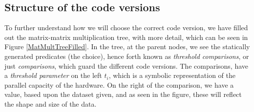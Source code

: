 \subsection{Structure of the code versions}
To further understand how we will choose the correct code version, we have filled out the matrix-matrix multiplication tree, with more detail, which can be seen in Figure \ref{MatMultTreeFilled}. In the tree, at the parent nodes, we see the statically generated predicates (the choice), hence forth known as \textit{threshold comparisons}, or just \textit{comparisons}, which guard the different code versions. The comparisons, have a \textit{threshold parameter} on the left $t_i$, which is a symbolic representation of the parallel capacity of the hardware. On the right of the comparison, we have a value, based upon the dataset given, and as seen in the figure, these will reflect the shape and size of the data.
\begin{comment}
The process of autotuning a Futhark program is, to automatically pick the fastest combination (or single) code versions, based on the hardware the program is executed on, and some representative data. In the process of selecting the appropriate code version we have three important terms we, that we be central to this report, and therefore we wish to clearly define them in the context of this report;	
\paragraph{Threshold parameter} or just \textit{threshold} is a value that symbolizes the capacity for parallelism (memory, thread count etc.), of the hardware the program is executed on.
\paragraph{Dataset value} is a value that represent some of the dataset given. For example for the outer \texttt{map} in matrix-matrix multiplication, the dataset value would (primarily) be constructed by the number of rows.
\paragraph{Predicate} threshold comparison, or just comparison, is a comparison between a threshold and a dataset value that guard which code version to use. \\
To pick the best version, we need to tune the threshold parameters, to values that will result en the combination of code versions that gives the fastest runtime. This process is called tuning. The guarding predicates are of the form $threshod \; \leq \; dataset\; value$. By default the threshold parameter is set to a value off $2^{15}$, as an estimate, but is likely sub-optimal. With these terms, we can now fill out the example in Figure \ref{MatMultTree}, getting Figure \ref{MatMultTreeFilled}. 
\end{comment}

